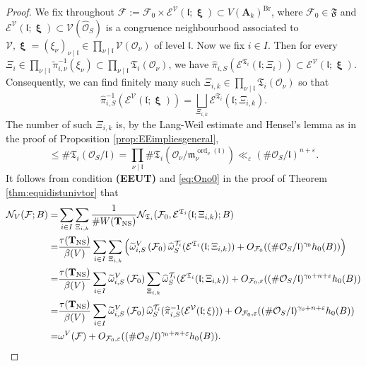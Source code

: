 \documentclass[11pt,letterpaper]{amsart}
\newcommand{\CE}{{\mathcal {E}}}
\newcommand{\CF}{{\mathcal {F}}}
\newcommand{\CN}{{\mathcal {N}}}
\newcommand{\CO}{{\mathcal {O}}}
\newcommand{\CV}{{\mathcal {V}}}
\newcommand{\RA}{{\mathbf {A}}}
\newcommand{\CTUT}{\mathcal{T}}
\newcommand{\FTUT}{\mathfrak{T}}
\newcommand{\CTNS}{\mathbf{T}_{\operatorname{NS}}}
\DeclareMathOperator{\bxi}{\mathbf{\xi}}
\theoremstyle{plain}
\numberwithin{equation}{section}
\theoremstyle{definition}
\theoremstyle{remark}
\begin{document}
\begin{proof}
We fix throughout $\CF:=\CF_0\times \CE^\CV(\mathfrak{l};\bxi)\subset V(\RA_k)^{\operatorname{Br}}$, where $\CF_0\in\mathfrak{F}$ and $\CE^\CV(\mathfrak{l};\bxi)\subset \CV(\widehat{\CO}_S)$ is a congruence neighbourhood  associated to  $\CV,\bxi=(\xi_\nu)_{\nu\mid \mathfrak{l}}\in\prod_{\nu\mid \mathfrak{l}} \CV(\CO_\nu)$ of level $\mathfrak{l}$.
Now we fix $i\in I$. Then for every $\Xi_i\in \prod_{\nu\mid\mathfrak{l}}\widetilde{\pi}_{i,\nu}^{-1}(\xi_\nu)\subset\prod_{\nu\mid \mathfrak{l}}\FTUT_i(\CO_\nu)$, we have $\widehat{\pi}_{i,S}(\CE^{\FTUT_i}(\mathfrak{l};\Xi_i))\subset \CE^\CV(\mathfrak{l};\bxi)$. 
	Consequently, we can find finitely many such $\Xi_{i,k}\in\prod_{\nu\mid\mathfrak{l}}\FTUT_i(\CO_\nu)$ so that 
	$$\widehat{\pi}_{i,S}^{-1}(\CE^\CV(\mathfrak{l};\bxi))=\bigsqcup_{\Xi_{i,k}}\CE^{\FTUT_i}(\mathfrak{l};\Xi_{i,k}).$$ The number of such $\Xi_{i,k}$ is, by the Lang-Weil estimate \cite{Lang-Weil} and Hensel's lemma as in the proof of Proposition \ref{prop:EEimpliesgeneral}, $$\leqslant\#\FTUT_i(\CO_S/\mathfrak{l}) =\prod_{\nu\mid \mathfrak{l}}\#\FTUT_i(\CO_\nu/\mathfrak{m}_\nu^{\operatorname{ord}_\nu(\mathfrak{l})})\ll_\varepsilon(\#\CO_S/\mathfrak{l})^{n+\varepsilon}.$$
	It follows from condition \textbf{(EEUT)} and \eqref{eq:Ono0} in the proof of Theorem \ref{thm:equidistunivtor} that
	\begin{align*}
		\CN_V(\CF;B)=&\sum_{i\in I}\sum_{\Xi_{i,k}}\frac{1}{\#W(\CTNS)}\CN_{\FTUT_i}(\CF_0,\CE^{\FTUT_i}(\mathfrak{l};\Xi_{i,k});B)\\ =&\frac{\tau(\CTNS)}{\beta(V)}
		\sum_{i\in I}\sum_{\Xi_{i,k}}\left(\widetilde{\omega}_{i,S}^V\left(\CF_0\right)\widehat{\omega}_S^{\CTUT_i}(\CE^{\FTUT_i}(\mathfrak{l};\Xi_{i,k}))+O_{\CF_0}((\#\CO_S/\mathfrak{l})^{\gamma_0} h_0(B))\right)\\ =&\frac{\tau(\CTNS)}{\beta(V)}\sum_{i\in I}\widetilde{\omega}_{i,S}^V\left(\CF_0\right)\sum_{\Xi_{i,k}} \widehat{\omega}_S^{\CTUT_i}(\CE^{\FTUT_i}(\mathfrak{l};\Xi_{i,k}))+O_{\CF_0,\varepsilon}((\#\CO_S/\mathfrak{l})^{\gamma_0+n+\varepsilon} h_0(B))\\ =&\frac{\tau(\CTNS)}{\beta(V)}\sum_{i\in I}\widetilde{\omega}_{i,S}^V\left(\CF_0\right)\widehat{\omega}_S^{\CTUT_i}(\widehat{\pi}_{i,S}^{-1}(\CE^\CV(\mathfrak{l};\bxi)))+O_{\CF_0,\varepsilon}((\#\CO_S/\mathfrak{l})^{\gamma_0+n+\varepsilon} h_0(B))\\ =&\omega^V(\CF)+O_{\CF_0,\varepsilon}((\#\CO_S/\mathfrak{l})^{\gamma_0+n+\varepsilon} h_0(B)). \qedhere
	\end{align*}
\end{proof}
\end{document}
